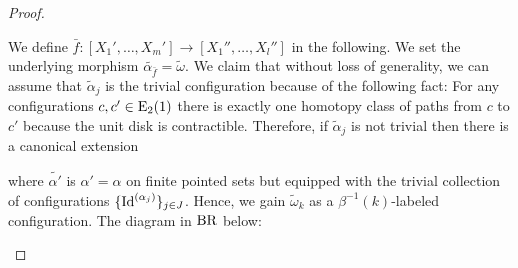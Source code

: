 \begin{proof}
\begin{enumerate}
\begin{center}
        \end{center}
        We define $\bar{f} \colon  [X_1', \dots, X_m'] \to [X_1'', \dots,
        X_l'']$ in the following. We set the underlying morphism
        $\widetilde{\alpha_{\bar{f}}} = \widetilde{\omega}$. We claim that  
        without loss of generality, we can assume that $\widetilde{\alpha}_j$ is
        the trivial configuration because of the following fact: For any
        configurations $c, c' \in \operatorname{E}_2(1)$ there is exactly one homotopy class
        of paths from $c$ to $c'$ because the unit disk is contractible.
        Therefore, if $\widetilde{\alpha}_j$ is not trivial then there is a
        canonical extension 
        \begin{center}
        \end{center}
        where $\widetilde{\alpha'}$ is $\alpha' = \alpha$ on finite pointed sets
        but equipped with the trivial collection of configurations
        $\{\operatorname{Id}^{(\alpha_j)}\}_{j \in J}$. Hence, we gain $\widetilde{\omega}_k$ as
        a $\beta^{-1}(k)$-labeled configuration. The diagram in $\operatorname{BR}$ below:
        \begin{center}
\end{center}
\end{enumerate}
\end{proof}

